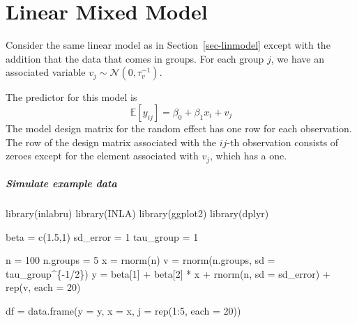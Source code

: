 \documentclass[
  letterpaper,
  DIV=11,
  numbers=noendperiod]{scrartcl}
\let\oldsubparagraph\subparagraph
\renewcommand{\subparagraph}[1]{\oldsubparagraph{#1}\mbox{}}
\newenvironment{Shaded}{\begin{snugshade}}{\end{snugshade}}
\newcommand{\AttributeTok}[1]{\textcolor[rgb]{0.40,0.45,0.13}{#1}}
\newcommand{\DecValTok}[1]{\textcolor[rgb]{0.68,0.00,0.00}{#1}}
\newcommand{\FloatTok}[1]{\textcolor[rgb]{0.68,0.00,0.00}{#1}}
\newcommand{\FunctionTok}[1]{\textcolor[rgb]{0.28,0.35,0.67}{#1}}
\newcommand{\NormalTok}[1]{\textcolor[rgb]{0.00,0.23,0.31}{#1}}
\newcommand{\OtherTok}[1]{\textcolor[rgb]{0.00,0.23,0.31}{#1}}
\newcommand{\SpecialCharTok}[1]{\textcolor[rgb]{0.37,0.37,0.37}{#1}}
\begin{document}
\section{Linear Mixed Model}\label{linear-mixed-model}

Consider the same linear model as in Section~\ref{sec-linmodel} except
with the addition that the data that comes in groups. For each group
\(j\), we have an associated variable
\(v_j \sim \mathcal{N}(0, \tau^{-1}_v)\).

The predictor for this model is \[
\mathbb{E}\left[ y_{ij} \right] = \beta_0 + \beta_1 x_i + v_j
\] The model design matrix for the random effect has one row for each
observation. The row of the design matrix associated with the \(ij\)-th
observation consists of zeroes except for the element associated with
\(v_j\), which has a one.

\subparagraph{\texorpdfstring{\textbf{\emph{Simulate example
data}}}{Simulate example data}}\label{simulate-example-data-1}

\begin{Shaded}
\begin{Highlighting}[]
\FunctionTok{library}\NormalTok{(inlabru)}
\FunctionTok{library}\NormalTok{(INLA)}
\FunctionTok{library}\NormalTok{(ggplot2)}
\FunctionTok{library}\NormalTok{(dplyr)}
\end{Highlighting}
\end{Shaded}

\begin{Shaded}
\begin{Highlighting}[]
\NormalTok{beta }\OtherTok{=} \FunctionTok{c}\NormalTok{(}\FloatTok{1.5}\NormalTok{,}\DecValTok{1}\NormalTok{)}
\NormalTok{sd\_error }\OtherTok{=} \DecValTok{1}
\NormalTok{tau\_group }\OtherTok{=} \DecValTok{1}

\NormalTok{n }\OtherTok{=} \DecValTok{100}
\NormalTok{n.groups }\OtherTok{=} \DecValTok{5}
\NormalTok{x }\OtherTok{=} \FunctionTok{rnorm}\NormalTok{(n)}
\NormalTok{v }\OtherTok{=} \FunctionTok{rnorm}\NormalTok{(n.groups, }\AttributeTok{sd =}\NormalTok{ tau\_group}\SpecialCharTok{\^{}}\NormalTok{\{}\SpecialCharTok{{-}}\DecValTok{1}\SpecialCharTok{/}\DecValTok{2}\NormalTok{\})}
\NormalTok{y }\OtherTok{=}\NormalTok{ beta[}\DecValTok{1}\NormalTok{] }\SpecialCharTok{+}\NormalTok{ beta[}\DecValTok{2}\NormalTok{] }\SpecialCharTok{*}\NormalTok{ x }\SpecialCharTok{+} \FunctionTok{rnorm}\NormalTok{(n, }\AttributeTok{sd =}\NormalTok{ sd\_error) }\SpecialCharTok{+}
  \FunctionTok{rep}\NormalTok{(v, }\AttributeTok{each =} \DecValTok{20}\NormalTok{)}

\NormalTok{df }\OtherTok{=} \FunctionTok{data.frame}\NormalTok{(}\AttributeTok{y =}\NormalTok{ y, }\AttributeTok{x =}\NormalTok{ x, }\AttributeTok{j =} \FunctionTok{rep}\NormalTok{(}\DecValTok{1}\SpecialCharTok{:}\DecValTok{5}\NormalTok{, }\AttributeTok{each =} \DecValTok{20}\NormalTok{))  }
\end{Highlighting}
\end{Shaded}
\end{document}
